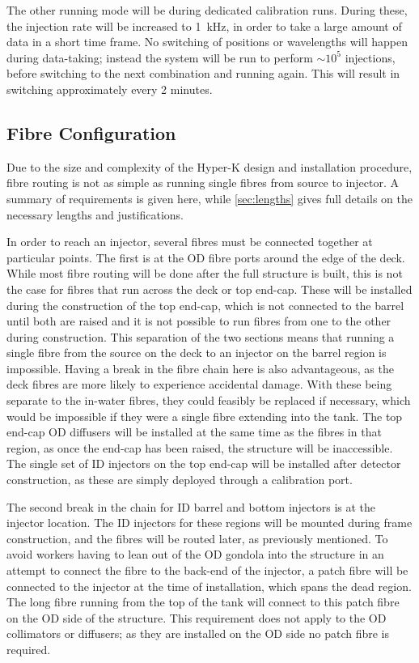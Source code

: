\documentclass[a4paper,11pt]{article}
\let\oldsim\sim
\renewcommand{\sim}{{\oldsim}}
\begin{document}
The other running mode will be during dedicated calibration runs. During these, the injection rate will be increased to 1~kHz, in order to take a large amount of data in a short time frame. No switching of positions or wavelengths will happen during data-taking; instead the system will be run to perform $\sim10^5$ injections, before switching to the next combination and running again. This will result in switching approximately every 2 minutes.

\subsection{Fibre Configuration}
Due to the size and complexity of the Hyper-K design and installation procedure, fibre routing is not as simple as running single fibres from source to injector. A summary of requirements is given here, while \cref{sec:lengths} gives full details on the necessary lengths and justifications.

In order to reach an injector, several fibres must be connected together at particular points. The first is at the OD fibre ports around the edge of the deck. While most fibre routing will be done after the full structure is built, this is not the case for fibres that run across the deck or top end-cap. These will be installed during the construction of the top end-cap, which is not connected to the barrel until both are raised and it is not possible to run fibres from one to the other during construction. This separation of the two sections means that running a single fibre from the source on the deck to an injector on the barrel region is impossible. Having a break in the fibre chain here is also advantageous, as the deck fibres are more likely to experience accidental damage. With these being separate to the in-water fibres, they could feasibly be replaced if necessary, which would be impossible if they were a single fibre extending into the tank. The top end-cap OD diffusers will be installed at the same time as the fibres in that region, as once the end-cap has been raised, the structure will be inaccessible. The single set of ID injectors on the top end-cap will be installed after detector construction, as these are simply deployed through a calibration port.

The second break in the chain for ID barrel and bottom injectors is at the injector location. The ID injectors for these regions will be mounted during frame construction, and the fibres will be routed later, as previously mentioned. To avoid workers having to lean out of the OD gondola into the structure in an attempt to connect the fibre to the back-end of the injector, a patch fibre will be connected to the injector at the time of installation, which spans the dead region. The long fibre running from the top of the tank will connect to this patch fibre on the OD side of the structure. This requirement does not apply to the OD collimators or diffusers; as they are installed on the OD side no patch fibre is required. 
\end{document}
